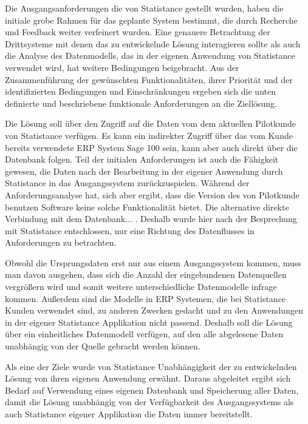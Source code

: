 
Die Ausgangsanforderungen die von Statistance gestellt wurden, haben die initiale grobe Rahmen für das geplante System bestimmt, die durch Recherche und Feedback weiter verfeinert wurden. Eine genauere Betrachtung der Drittsysteme mit denen das zu entwickelnde Lösung interagieren sollte als auch die Analyse des Datenmodells, das in der eigenen Anwendung von Statistance verwendet wird, hat weitere Bedingungen beigebracht. Aus der Zusammenführung der gewünschten Funktionalitäten, ihrer Priorität und der identifizierten Bedingungen und Einschränkungen ergeben sich die unten definierte und beschriebene funktionale Anforderungen an die Ziellösung.

Die Lösung soll über den Zugriff auf die Daten vom dem aktuellen Pilotkunde von Statistance verfügen. Es kann ein indirekter Zugriff über das vom Kunde bereits verwendete ERP System Sage 100 sein, kann aber auch direkt über die Datenbank folgen.
Teil der initialen Anforderungen ist auch die Fähigkeit gewesen, die Daten nach der Bearbeitung in der eigener Anwendung durch Statistance in das Ausgangssystem zurückzuspielen. Während der Anforderungsanalyse hat, sich aber ergibt, dass die Version des von Pilotkunde benutzen Software keine solche Funktionalität bietet. Die alternative direkte Verbindung mit dem Datenbank... . Deshalb wurde hier nach der Besprechung mit Statistance entschlossen, nur eine Richtung des Datenflusses in Anforderungen zu betrachten.

Obwohl die Ursprungsdaten erst nur aus einem Ausgangssystem kommen, muss man davon ausgehen, dass sich die Anzahl der eingebundenen Datenquellen vergrößern wird und somit weitere unterschiedliche Datenmodelle infrage kommen. Außerdem sind die Modelle in ERP Systemen, die bei Statistance Kunden verwendet sind, zu anderen Zwecken gedacht und zu den Anwendungen in der eigener Statistance Applikation nicht passend. Deshalb soll die Lösung über ein einheitliches Datenmodell verfügen, auf den alle abgelesene Daten unabhängig von der Quelle gebracht werden können.

Als eine der Ziele wurde von Statistance Unabhängigkeit der zu entwickelnden Lösung von ihren eigenen Anwendung erwähnt. Daraus abgeleitet ergibt sich Bedarf auf Verwendung eines eigenen Datenbank und Speicherung aller Daten, damit die Lösung unabhängig von der Verfügbarkeit des Ausgangssystems als auch Statistance eigener Applikation die Daten immer bereitstellt.

